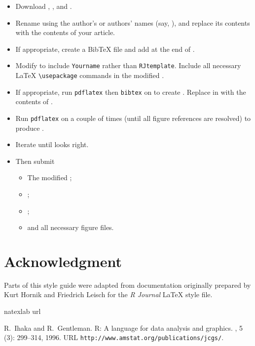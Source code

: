 \begin{itemize}

\item Download , ,
and .

\item Rename  using the author's or authors' names
(say, ), and replace its
contents with the contents of your article.

\item If appropriate, create a  BibTeX file and add
\verb|| at the end of .

\item Modify  to include {\tt Yourname} rather
than {\tt RJtemplate}. Include all necessary \LaTeX{} \verb|\usepackage|
commands in the modified .

\item If appropriate, run {\tt pdflatex} then
 {\tt bibtex} on 
to create . Replace
\verb||
in  with
the contents of .

\item Run {\tt pdflatex} on  a couple of times
(until all figure references are resolved) to produce .

\item Iterate until  looks right.

\item Then submit
  \begin{itemize}
  \item The modified ;
  \item {};
  \item {};
  \item and all necessary figure files.
  \end{itemize}
\end{itemize}

\section{Acknowledgment}

Parts of this style guide were adapted from documentation originally 
prepared by Kurt Hornik and Friedrich Leisch for the \emph{R Journal}
\LaTeX{} style file.

\begin{thebibliography}{1}
\expandafter\ifx\csname natexlab\endcsname\relax\def\natexlab#1{#1}\fi
\expandafter\ifx\csname url\endcsname\relax
  \def\url#1{{\tt #1}}\fi

R.~Ihaka and R.~Gentleman.
\newblock R: A language for data analysis and graphics.
, 5
  (3): 299--314, 1996.
\newblock URL \url{http://www.amstat.org/publications/jcgs/}.

\end{thebibliography}



